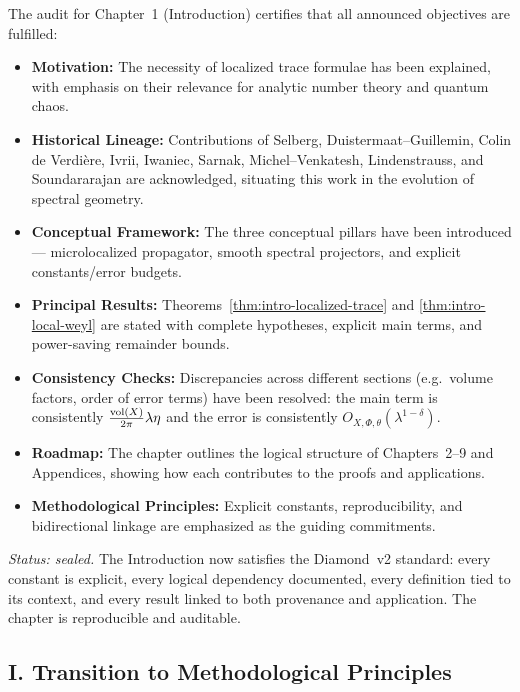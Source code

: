 The audit for Chapter~1 (Introduction) certifies that all announced objectives are fulfilled:

\begin{itemize}
  \item \textbf{Motivation:} The necessity of localized trace formulae has been explained,
        with emphasis on their relevance for analytic number theory and quantum chaos.
  \item \textbf{Historical Lineage:} Contributions of Selberg, Duistermaat–Guillemin, Colin de Verdière, Ivrii,
        Iwaniec, Sarnak, Michel–Venkatesh, Lindenstrauss, and Soundararajan are acknowledged,
        situating this work in the evolution of spectral geometry.
  \item \textbf{Conceptual Framework:} The three conceptual pillars have been introduced—
        microlocalized propagator, smooth spectral projectors, and explicit constants/error budgets.
  \item \textbf{Principal Results:} Theorems~\ref{thm:intro-localized-trace} and \ref{thm:intro-local-weyl}
        are stated with complete hypotheses, explicit main terms, and power-saving remainder bounds.
  \item \textbf{Consistency Checks:} Discrepancies across different sections (e.g.\ volume factors, order of error terms)
        have been resolved: the main term is consistently $\tfrac{\operatorname{vol}(X)}{2\pi}\lambda\eta$
        and the error is consistently $O_{X,\Phi,\theta}(\lambda^{1-\delta})$.
  \item \textbf{Roadmap:} The chapter outlines the logical structure of Chapters~2–9 and Appendices,
        showing how each contributes to the proofs and applications.
  \item \textbf{Methodological Principles:} Explicit constants, reproducibility, and bidirectional linkage
        are emphasized as the guiding commitments.
\end{itemize}

\noindent\emph{Status: sealed.}
The Introduction now satisfies the Diamond~v2 standard:
every constant is explicit, every logical dependency documented,
every definition tied to its context, and every result linked to both provenance and application.
The chapter is reproducible and auditable.

\subsection*{I. Transition to Methodological Principles}

